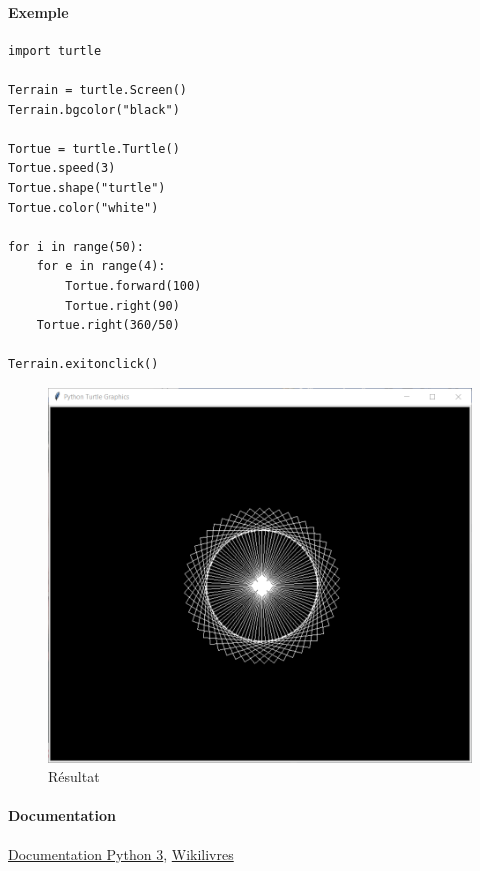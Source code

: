 \documentclass[a4paper, french, 10pt]{article}
\begin{document}
\paragraph{Exemple}
\begin{verbatim}
import turtle

Terrain = turtle.Screen()
Terrain.bgcolor("black")

Tortue = turtle.Turtle()
Tortue.speed(3)
Tortue.shape("turtle")
Tortue.color("white")

for i in range(50):
    for e in range(4):
        Tortue.forward(100)
        Tortue.right(90)
    Tortue.right(360/50)

Terrain.exitonclick()
\end{verbatim}

\begin{figure}[h]
\begin{center}
\includegraphics[scale=0.5]{turtle.png}
\caption*{Résultat}
\end{center}
\end{figure}

\paragraph{Documentation} \href{https://docs.python.org/fr/3.6/library/turtle.html#methods-specific-to-screen-not-inherited-from-turtlescreen}{Documentation Python 3}, \href{https://fr.wikibooks.org/wiki/Programmation_Python/Turtle}{Wikilivres}
\end{document}
